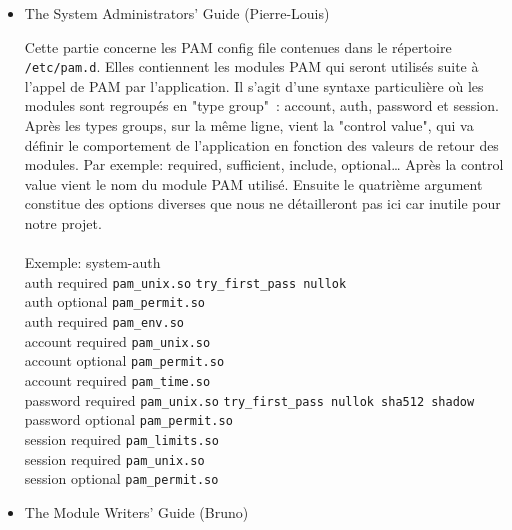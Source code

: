 \documentclass{article}
\begin{document}
  \begin{itemize}
    \item{The System Administrators' Guide (Pierre-Louis)}

    \vspace{0.05cm}

Cette partie concerne les PAM config file contenues dans le répertoire
\verb|/etc/pam.d|. Elles contiennent les modules PAM qui seront utilisés suite à
l’appel de PAM par l’application. Il s’agit d’une syntaxe particulière où les
modules sont regroupés en "type group" : account, auth, password et session.
Après les types groups, sur la même ligne, vient la "control value", qui va
définir le comportement de l’application en fonction des valeurs de retour des
modules. Par exemple: required, sufficient, include, optional… Après la control
value vient le nom du module PAM utilisé. Ensuite le quatrième argument
constitue des options diverses que nous ne détailleront pas ici car inutile
pour notre projet.
\\ \\
    Exemple: system-auth \\

    auth      required  \texttt{pam\_unix.so}   \texttt{try\_first\_pass
    nullok} \\
    auth      optional  \texttt{pam\_permit.so} \\
    auth      required  \texttt{pam\_env.so} \\

    account   required  \texttt{pam\_unix.so} \\
    account   optional  \texttt{pam\_permit.so} \\
    account   required  \texttt{pam\_time.so} \\

    password  required  \texttt{pam\_unix.so}   \texttt{try\_first\_pass nullok
    sha512 shadow} \\
    password  optional  \texttt{pam\_permit.so} \\

    session   required  \texttt{pam\_limits.so} \\
    session   required  \texttt{pam\_unix.so} \\
    session   optional  \texttt{pam\_permit.so} \\

    \item{The Module Writers' Guide (Bruno)}

    \vspace{0.05cm}


\end{itemize}
\end{document}
